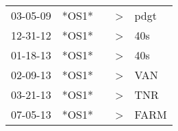 \begin{supertabular}{lllll}
 03-05-09 &  *OS1* &   &  \textgreater &  pdgt \\
 12-31-12 &  *OS1* &   &  \textgreater &   40s \\
 01-18-13 &  *OS1* &   &  \textgreater &   40s \\
 02-09-13 &  *OS1* &   &  \textgreater &   VAN \\
 03-21-13 &  *OS1* &   &  \textgreater &   TNR \\
 07-05-13 &  *OS1* &   &  \textgreater &  FARM \\
\end{supertabular}
